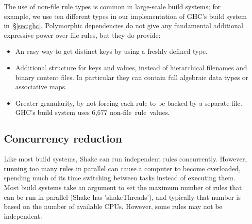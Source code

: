 %
%
%
%

The use of non-file rule types is common in large-scale build systems; for
example, we use ten different types in our implementation of GHC's build system
in~\S\ref{sec:ghc}. Polymorphic dependencies do not give any fundamental
additional expressive power over file rules, but they do provide:

\begin{itemize}
\item An easy way to get distinct keys by using a freshly defined type.
\item Additional structure for keys and values, instead of hierarchical
filenames and binary content files. In particular they can contain full
algebraic data types or associative maps.
\item Greater granularity, by not forcing each rule to be backed by a separate
file. GHC's build system uses 6,677 \mbox{non-file~rule~values}.
\end{itemize}

\subsection{Concurrency reduction\label{sec:concurrency-reduction}}

Like most build systems, Shake can run independent rules concurrently.
However, running too many rules in parallel can cause a computer to become overloaded,
spending much of its time switching between tasks instead of executing them.
Most build systems take an argument to set the maximum number of rules that can
be run in parallel (Shake has \lst'shakeThreads'), and typically that number
is based on the number of available CPUs. However, some rules may not be
independent:

